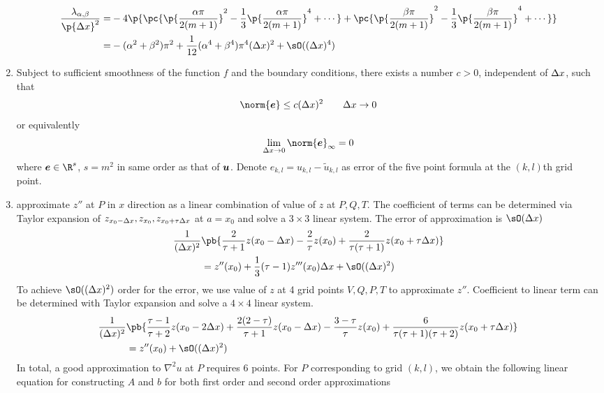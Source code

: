 \documentclass[11pt]{article}
\begin{document}
\begin{enumerate}
    \begin{align*}
        \frac{\lambda_{\alpha,\beta}}{\p{\Dx}^2}
            =& -4 \p{
                \pc{
                    \p{\frac{\alpha\pi}{2(m+1)}}^2 - \frac{1}{3} \p{\frac{\alpha\pi}{2(m+1)}}^4 + \cdots
                } + 
                \pc{
                    \p{\frac{\beta\pi}{2(m+1)}}^2 - \frac{1}{3} \p{\frac{\beta\pi}{2(m+1)}}^4 + \cdots
                } } \\
            =& -(\alpha^2 + \beta^2) \pi^2 + \frac{1}{12} (\alpha^4 + \beta^4) \pi^4 (\Dx)^2  + \sO((\Dx)^4)
    \end{align*}
    \item {} Subject to sufficient smoothness of the function $f$ and the boundary conditions, there exists a number $c>0$, independent of $\Delta x$, such that 
    \[
        \norm{\be} \leq c(\Dx)^2
        \quad \quad \Dx \to 0   
    \]
    or equivalently 
    \[
        \lim_{\Dx \to 0} \norm{\be}_{\infty} = 0
    \]
    where $\be \in \R^s$, $s=m^2$ in same order as that of $\bm{u}$. Denote $e_{k,l} = u_{k,l} - \tilde{u}_{k,l}$ as error of the five point formula at the $(k,l)$th grid point.
    \item {} approximate $z''$ at $P$ in $x$ direction as a linear combination of value of $z$ at $P,Q,T$. The coefficient of terms can be determined via Taylor expansion of $z_{x_0-\Delta x},z_{x_0},z_{x_0+\tau\Delta x}$ at $a=x_0$ and solve a $3\times 3$ linear system. The error of approximation is $\sO(\Dx)$
    \begin{align*}
        \frac{1}{(\Dx)^2} &\pb{
            \frac{2}{\tau+1} z(x_0-\Dx) - \frac{2}{\tau} z(x_0) + \frac{2}{\tau(\tau+1)} z(x_0+\tau\Dx)
        } \\
        &= z''(x_0) + \frac{1}{3} (\tau-1)z'''(x_0)\Dx + \sO((\Dx)^2)
    \end{align*}
    To achieve $\sO((\Dx)^2)$ order for the error, we use value of $z$ at 4 grid points $V,Q,P,T$ to approximate $z''$. Coefficient to linear term can be determined with Taylor expansion and solve a $4\times 4$ linear system.
    \begin{align*}
        \frac{1}{(\Dx)^2} &\pb{
            \frac{\tau-1}{\tau+2} z(x_0-2\Dx) + \frac{2(2-\tau)}{\tau+1} z(x_0-\Dx) - \frac{3-\tau}{\tau} z(x_0) + \frac{6}{\tau(\tau+1)(\tau+2)} z(x_0+\tau\Dx)
        } \\ 
        &= z''(x_0) + \sO((\Dx)^2)
    \end{align*}
    In total, a good approximation to $\nabla^2 u$ at $P$ requires 6 points. For $P$ corresponding to grid $(k,l)$, we obtain the following linear equation for constructing $A$ and $b$ for both first order and second order approximations

\end{enumerate}
\end{document}
